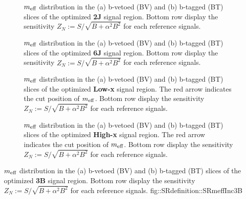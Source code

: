 \clearpage
\begin{figure}[h]
  \centering
    \caption{
     $m_{\mathrm{eff}}$ distribution in the (a) b-vetoed (BV) and (b) b-tagged (BT) slices of the optimized \textbf{2J} signal region. Bottom row display the sensitivity $Z_N := S/\sqrt{B+\alpha^2 B^2}$ for each reference signals.
    \label{fig::SRdefinition::SRmeffInc2J}}
\end{figure}

\begin{figure}[h]
  \centering
    \caption{ 
     $m_{\mathrm{eff}}$ distribution in the (a) b-vetoed (BV) and (b) b-tagged (BT) slices of the optimized \textbf{6J} signal region. Bottom row display the sensitivity $Z_N := S/\sqrt{B+\alpha^2 B^2}$ for each reference signals.
    \label{fig::SRdefinition::SRmeffInc6J} }
\end{figure}

\clearpage
\begin{figure}[h]
  \centering
    \caption{ 
     $m_{\mathrm{eff}}$ distribution in the (a) b-vetoed (BV) and (b) b-tagged (BT) slices of the optimized \textbf{Low-x} signal region. The red arrow indicates the cut position of $m_{\mathrm{eff}}$. Bottom row display the sensitivity $Z_N := S/\sqrt{B+\alpha^2 B^2}$ for each reference signals.
    \label{fig::SRdefinition::SRmeffIncLowx}}
\end{figure}

\begin{figure}[h]
  \centering
    \caption{ 
     $m_{\mathrm{eff}}$ distribution in the (a) b-vetoed (BV) and (b) b-tagged (BT) slices of the optimized \textbf{High-x} signal region. The red arrow indicates the cut position of $m_{\mathrm{eff}}$. Bottom row display the sensitivity $Z_N := S/\sqrt{B+\alpha^2 B^2}$ for each reference signals.
    \label{fig::SRdefinition::SRmeffIncHighx}       }
\end{figure}

\clearpage
{}
{$m_{\mathrm{eff}}$ distribution in the (a) b-vetoed (BV) and (b) b-tagged (BT) slices of the optimized \textbf{3B} signal region. Bottom row display the sensitivity $Z_N := S/\sqrt{B+\alpha^2 B^2}$ for each reference signals.}
{fig::SRdefinition::SRmeffInc3B}
